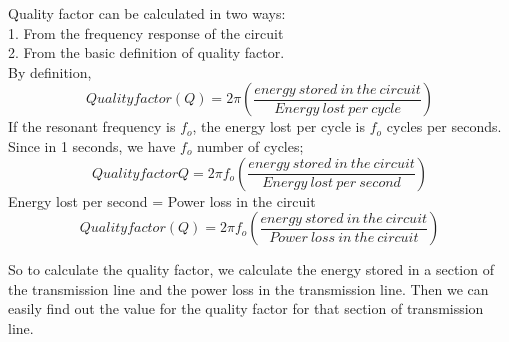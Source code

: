 	Quality factor can be calculated in two ways:\\
	1. From the frequency response of the circuit\\
	2. From the basic definition of quality factor.\\
	
	By definition,
	\begin{dmath}
	Quality factor(Q) =2\pi\left(\frac{ energy\ stored\ in\ the\ circuit  }{Energy\ lost\ per\ cycle}\right) 
	\end{dmath}  
	If the resonant frequency is $ f_{o} $, the energy lost per cycle is $ f_{o} $ cycles per seconds. Since in 1 seconds, we have $ f_{o} $ number of cycles;\\
	\begin{dmath}
	Quality factor Q=2 \pi f_{o}\left(\frac{energy\ stored\ in\ the\ circuit }{Energy\ lost\ per\ second}\right)
	\end{dmath}
	 Energy lost per second = Power loss in the circuit  
	\begin{dmath}
	Quality factor (Q)=2 \pi f_{o}\left(\frac{energy\ stored\ in\ the\ circuit }{Power\ loss\ in\ the\ circuit}\right)
	\end{dmath}
	
	So to calculate the quality factor, we calculate the energy stored in a section of the transmission line and the power loss in the transmission line. Then we can easily find out the value for the quality factor for that section of transmission line.\\
	
